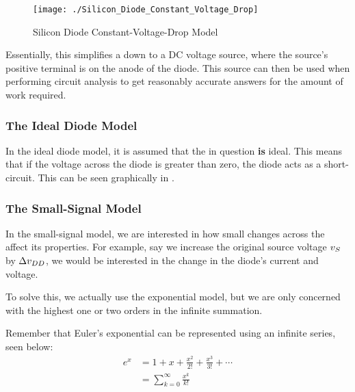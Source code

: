 \begin{figure}[h!tbp]
  \centering
  \texttt{[image: ./Silicon\_Diode\_Constant\_Voltage\_Drop]}
  \caption{Silicon Diode Constant-Voltage-Drop Model \parencite[p.~193]{sedraTextbook7}}
  \label{fig:Silicon_Diode_Constant_Voltage_Drop}
\end{figure}

Essentially, this simplifies a  down to a DC voltage source, where the source's positive terminal is on the anode of the diode.
This source can then be used when performing circuit analysis to get reasonably accurate answers for the amount of work required.

\subsubsection{The Ideal Diode Model}\label{subsubsec:Ideal_Diode_Model}
In the ideal diode model, it is assumed that the  in question \textbf{is} ideal.
This means that if the voltage across the diode is greater than zero, the diode acts as a short-circuit.
This can be seen graphically in .

\subsubsection{The Small-Signal Model}\label{subsubsec:Diode_Small-Signal_Model}
In the small-signal model, we are interested in how small changes across the  affect its properties.
For example, say we increase the original source voltage $v_{S}$ by $\Delta v_{DD}$, we would be interested in the change in the diode's current and voltage.

To solve this, we actually use the exponential model, but we are only concerned with the highest one or two orders in the infinite summation.

\begin{blackbox}
  Remember that Euler's exponential can be represented using an infinite series, seen below:
  \begin{align*}
    e^{x} &= 1 + x + \frac{x^{2}}{2!} + \frac{x^{3}}{3!} + \cdots \\
    &= \sum\limits_{k = 0}^{\infty} \frac{x^{k}}{k!}
  \end{align*}
\end{blackbox}


